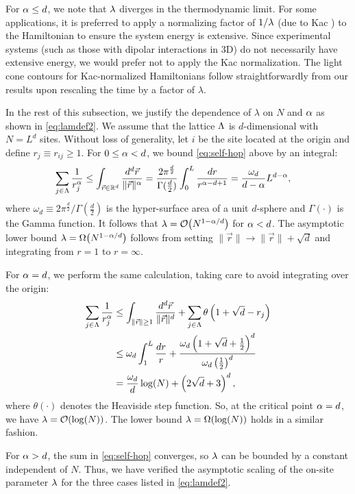 For $\alpha \le d$, we note that $\lambda$ diverges in the thermodynamic limit.
For some applications, it is preferred to apply a normalizing factor of $1/\lambda$ (due to Kac \cite{Kac63}) to the Hamiltonian to ensure the system energy is extensive. Since experimental systems (such as those with dipolar interactions in 3D) do not necessarily have extensive energy, we would prefer not to apply the Kac normalization. The light cone contours for Kac-normalized Hamiltonians follow straightforwardly from our results upon rescaling the time by a factor of $\lambda$.

In the rest of this subsection, we justify the dependence of $\lambda$ on $N$ and $\alpha$ as shown in \cref{eq:lamdef2}.
We assume that the lattice $\Lambda$ is $d$-dimensional with $N = L^d$ sites.
Without loss of generality, let $i$ be the site located at the origin and define $r_j \equiv r_{ij} \ge 1$.
For $0\le \alpha < d$, we bound \cref{eq:self-hop} above by an integral:
\begin{align}
	\sum_{j\in\Lambda} \frac{1}{r_{j}^{\alpha}} &\le \int_{\vec{r}\in \mathbb{R}^d} \frac{d^d\vec{r}}{\|\vec{r}\|^{\alpha}}
	= \frac{2\pi^{\frac d 2}}{\Gamma(\frac d2)} \int_0^L \frac{dr}{r^{\alpha-d+1}}  = \frac{\omega_d}{d-\alpha}L^{d-\alpha},
\end{align}
where $\omega_d\equiv 2\pi^{\frac d 2}\big/\Gamma(\frac{d}{2})$ is the hyper-surface area of a unit $d$-sphere and $\Gamma(\cdot)$ is the Gamma function.  It follows that $\lam = \O{ N^{1-\al/d}}$  for $\alpha<d$.
The asymptotic lower bound $\lam = \W{N^{1-\al/d}}$ follows from setting $\|\vec r\| \rightarrow \|\vec r\| +\sqrt d$ and integrating from $r=1$ to $r=\infty$.

For $\alpha = d$, we perform the same calculation, taking care to avoid integrating over the origin:
\begin{align}
	\sum_{j\in\Lambda} \frac{1}{r_{j}^{\alpha}} &\le  \int_{\|\vec{r}\| \ge 1} \frac{d^d\vec{r}}{\|\vec{r}\|^d} + \sum_{j \in \Lambda} \theta \left( 1+\sqrt{d} - r_j\right)
    \\ & \le  \omega_d \int_1^L \frac{dr}{r} + \frac{\omega_d\left(1+\sqrt d+\frac12\right)^d}{\omega_d\left(\frac12\right)^d}
    \\ &= \frac {\omega_d}d \log(N) + \left(2\sqrt d+3\right)^d,
\end{align}
where $\theta(\cdot)$ denotes the Heaviside step function. So, at the critical point $\alpha=d$, we have $\lam = \O{ \log(N)}$.
The lower bound $\lam = \W{\log(N)}$ holds in a similar fashion.

For $\alpha > d$, the sum in \cref{eq:self-hop} converges, so $\lambda$ can be bounded by a constant independent of $N$.
Thus, we have verified the asymptotic scaling of the on-site parameter $\lambda$ for the three cases listed in  \cref{eq:lamdef2}.


